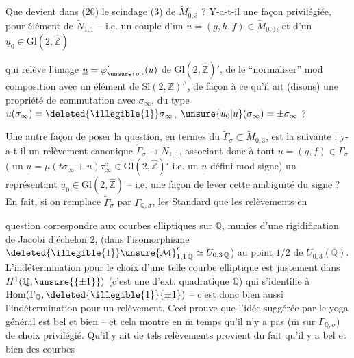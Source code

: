 Que devient dans (20) le scindage (3) de $\widetilde{M}_{0,3}$ ? Y-a-t-il une façon privilégiée, pour  élément de $\widetilde{N}_{1,1}$ -- i.e. un couple d'un $u=(g,h,f)\in\widetilde{M}_{0,3}$, et d'un $\underline{u}_0\in\mathrm{Gl}(2,\widehat{\mathbb Z})$


qui relève l'image $\underline{u}=\varphi'_{\unsure{\sigma}}(u)$ de $\mathrm{Gl}(2,\widehat{\mathbb Z})'$, de le ``normaliser'' mod  composition avec un élément de $\mathrm{Sl}(2,\mathbb Z)^\wedge$, de façon à ce qu'il ait  (disons) une propriété de commutation avec $\sigma_\infty$, du type $u(\sigma_\infty)=\deleted{\illegible{1}}\sigma_\infty$,  $\unsure{u_0|u}(\sigma_\infty)=\pm\sigma_\infty$ ?

Une autre façon de poser la question, en termes du  $\widetilde{\Gamma}_\sigma\subset\widetilde{M}_{0,3}$, est la suivante : y-a-t-il un relèvement canonique $\widetilde{\Gamma}_\sigma\longrightarrow\widetilde{N}_{1,1}$, associant donc à tout $\underline{u}=(g,f)\in\widetilde{\Gamma}_\sigma$ ( un $\underline{u}=\mu(t\sigma_\infty+u)\tau_\infty^\alpha\in\mathrm{Gl}(2,\widehat{\mathbb Z})'$\unsure{,|\}}  i.e. un $\underline{u}$ défini mod signe) un représentant $\underline{u}_0\in\mathrm{Gl}(2,\widehat{\mathbb Z})$ -- i.e. une façon de lever cette ambiguïté du signe ? En fait, si on remplace $\widetilde{\Gamma}_\sigma$ par $\Gamma_{\mathbb Q,\sigma}$, les  Standard  que les relèvements en


question  correspondre aux courbes elliptiques sur $\mathbb Q$, munies d'une rigidification de Jacobi d'échelon $2$,  (dans l'isomorphisme $\deleted{\illegible{1}}\unsure{\mathcal M}_{1,1\,\mathbb Q}'\simeq U_{0,3\,\mathbb Q}$) au point $1/2$ de $U_{0,3}(\mathbb Q)$. L'indétermination pour le choix d'une telle courbe elliptique est justement dans $H^1(\mathbb Q,\unsure{\{\pm1\}})$ (c'est une  d'ext. quadratique  $\mathbb Q$) qui s'identifie à $\mathrm{Hom}(\Gamma_{\mathbb Q},\deleted{\illegible{1}}\{\pm1\})$ -- c'est donc bien aussi l'indétermination pour un relèvement. Ceci prouve  que l'idée suggérée par le yoga général est bel et bien  -- et cela montre en $\overline{\mathrm m}$ temps qu'il n'y a pas ($\overline{\mathrm m}$ sur $\Gamma_{\mathbb Q,\sigma}$) de choix  privilégié. Qu'il y ait de tels relèvements  provient du fait qu'il y a bel et bien des courbes

